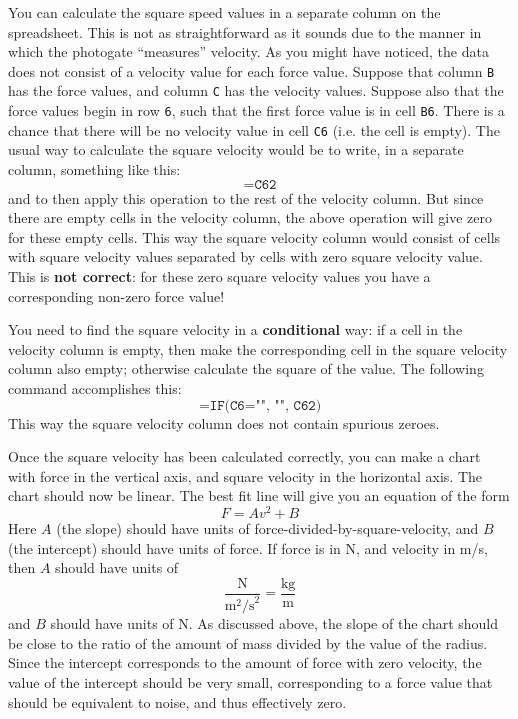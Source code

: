 You can calculate the square speed values in a separate column on the spreadsheet. This is not as straightforward as it sounds due to the manner in which the photogate ``measures'' velocity. As you might have noticed, the data does not consist of a velocity value for each force value. Suppose that column \texttt{B} has the force values, and column \texttt{C} has the velocity values. Suppose also that the force values begin in row \texttt{6}, such that the first force value is in cell \texttt{B6}. There is a chance that there will be no velocity value in cell \texttt{C6} (i.e. the cell is empty). The usual way to calculate the square velocity would be to write, in a separate column, something like this:
\begin{equation}
    \texttt{=C6\^{}2}
\end{equation}
and to then apply this operation to the rest of the velocity column. But since there are empty cells in the velocity column, the above operation will give zero for these empty cells. This way the square velocity column would consist of cells with square velocity values separated by cells with zero square velocity value. This is \textbf{not correct}: for these zero square velocity values you have a corresponding non-zero force value!

You need to find the square velocity in a \textbf{conditional} way: if a cell in the velocity column is empty, then make the corresponding cell in the square velocity column also empty; otherwise calculate the square of the value. The following command accomplishes this:
\begin{equation}
    \texttt{=IF(C6="", "", C6\^{}2)}
\end{equation}
This way the square velocity column does not contain spurious zeroes.

Once the square velocity has been calculated correctly, you can make a chart with force in the vertical axis, and square velocity in the horizontal axis. The chart should now be linear. The best fit line will give you an equation of the form
\begin{equation}
    F = A v^{2} + B
\end{equation}
Here $A$ (the slope) should have units of force-divided-by-square-velocity, and $B$ (the intercept) should have units of force. If force is in N, and velocity in m/s, then $A$ should have units of
\begin{equation}
    \frac{\text{N}}{\text{m}^{2}\text{/s}^{2}} = \frac{\text{kg}}{\text{m}}
\end{equation}
and $B$ should have units of N. As discussed above, the slope of the chart should be close to the ratio of the amount of mass divided by the value of the radius. Since the intercept corresponds to the amount of force with zero velocity, the value of the intercept should be very small, corresponding to a force value that should be equivalent to noise, and thus effectively zero.
%
